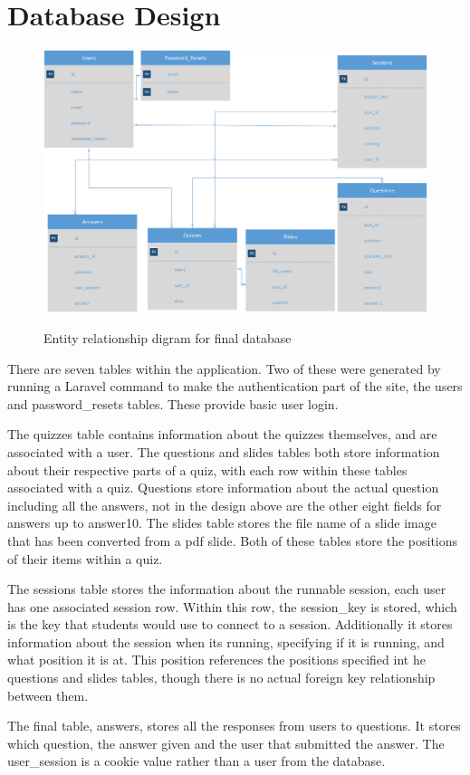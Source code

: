 \section{Database Design}
\begin{figure}
	\caption{Entity relationship digram for final database}
	\includegraphics[width=\textwidth]{Chapter3/Final-ER-Image}
	\label{fig:er-diagram}
\end{figure}
\newpage

There are seven tables within the application. Two of these were generated by running a Laravel command to make the authentication part of the site, the users and password\_resets tables. These provide basic user login.

The quizzes table contains information about the quizzes themselves, and are associated with a user. The questions and slides tables both store information about their respective parts of a quiz, with each row within these tables associated with a quiz. Questions store information about the actual question including all the answers, not in the design above are the other eight fields for answers up to answer10. The slides table stores the file name of a slide image that has been converted from a pdf slide. Both of these tables store the positions of their items within a quiz.

The sessions table stores the information about the runnable session, each user has one associated session row. Within this row, the session\_key is stored, which is the key that students would use to connect to a session. Additionally it stores information about the session when its running, specifying if it is running, and what position it is at. This position references the positions specified int he questions and slides tables, though there is no actual foreign key relationship between them. 

The final table, answers, stores all the responses from users to questions. It stores which question, the answer given and the user that submitted the answer. The user\_session is a cookie value rather than a user from the database.
